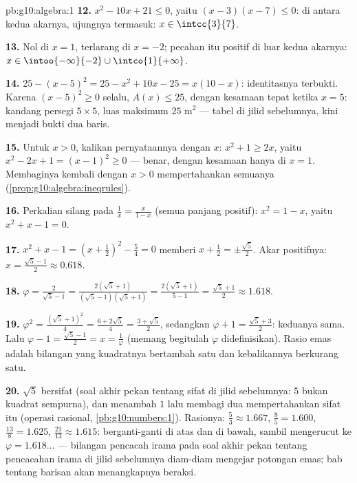 \begin{solution}{pb:g10:algebra:1}
\textbf{12.} $x^2 - 10x + 21 \leq 0$, yaitu
$(x - 3)(x - 7) \leq 0$: di antara kedua akarnya, ujungnya termasuk:
$x \in \intcc{3}{7}$.

\textbf{13.} Nol di $x = 1$, terlarang di $x = -2$; pecahan
itu positif di luar kedua akarnya:
$x \in \intoo{-\infty}{-2} \cup \intco{1}{+\infty}$.

\textbf{14.} $25 - (x - 5)^2 = 25 - x^2 + 10x - 25 =
x(10 - x)$: identitasnya terbukti. Karena $(x-5)^2 \geq 0$ selalu,
$A(x) \leq 25$, dengan kesamaan tepat ketika $x = 5$: kandang persegi
$5 \times 5$, luas maksimum $25$ m$^2$ --- tabel di jilid
sebelumnya, kini menjadi bukti dua baris.

\textbf{15.} Untuk $x > 0$, kalikan pernyataannya dengan $x$:
$x^2 + 1 \geq 2x$, yaitu $x^2 - 2x + 1 = (x - 1)^2 \geq 0$ ---
benar, dengan kesamaan hanya di $x = 1$. Membaginya kembali dengan
$x > 0$ mempertahankan semuanya (\cref{prop:g10:algebra:ineqrules}).

\textbf{16.} Perkalian silang pada $\frac1x = \frac{x}{1 - x}$
(semua panjang positif): $x^2 = 1 - x$, yaitu
$x^2 + x - 1 = 0$.

\textbf{17.} $x^2 + x - 1 = \left(x + \frac12\right)^2 -
\frac54 = 0$ memberi $x + \frac12 = \pm\frac{\sqrt5}{2}$. Akar
positifnya: $x = \frac{\sqrt5 - 1}{2} \approx 0.618$.

\textbf{18.} $\varphi = \frac{2}{\sqrt5 - 1} =
\frac{2(\sqrt5 + 1)}{(\sqrt5 - 1)(\sqrt5 + 1)}
= \frac{2(\sqrt5 + 1)}{5 - 1} = \frac{\sqrt5 + 1}{2}
\approx 1.618$.

\textbf{19.} $\varphi^2 = \frac{(\sqrt5 + 1)^2}{4} =
\frac{6 + 2\sqrt5}{4} = \frac{3 + \sqrt5}{2}$, sedangkan
$\varphi + 1 = \frac{\sqrt5 + 3}{2}$: keduanya sama. Lalu
$\varphi - 1 = \frac{\sqrt5 - 1}{2} = x = \frac1\varphi$ (memang
begitulah $\varphi$ didefinisikan). Rasio emas adalah bilangan
yang kuadratnya bertambah satu dan kebalikannya berkurang satu.

\textbf{20.} $\sqrt5$ bersifat  (soal akhir pekan tentang sifat
 di jilid sebelumnya: $5$ bukan kuadrat sempurna), dan menambah
$1$ lalu membagi dua mempertahankan sifat  itu (operasi rasional,
\cref{pb:g10:numbers:1}).
Rasionya: $\frac53 \approx 1.667$, $\frac85 = 1.600$,
$\frac{13}{8} = 1.625$, $\frac{21}{13} \approx 1.615$:
berganti-ganti di atas dan di bawah, sambil mengerucut ke
$\varphi = 1.618\ldots$ --- bilangan pencacah irama pada soal akhir pekan
tentang pencacahan irama di jilid sebelumnya diam-diam mengejar potongan
emas; bab tentang barisan akan menangkapnya beraksi.

\end{solution}
